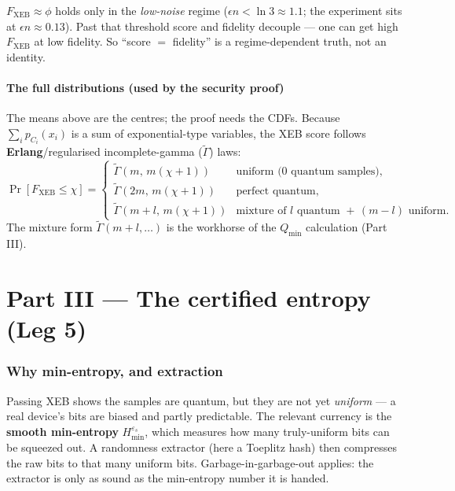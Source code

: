 \documentclass[11pt]{article}
\theoremstyle{definition}
\theoremstyle{plain}
\newcommand{\Fxeb}{F_{\mathrm{XEB}}}
\newcommand{\Hmin}{H_{\min}}
\newcommand{\epss}{\varepsilon_{s}}
\newcommand{\Qmin}{Q_{\min}}
\begin{document}
\begin{warnbox}
$\Fxeb\approx\phi$ holds only in the \emph{low-noise} regime ($\epsilon n<\ln3\approx1.1$;
the experiment sits at $\epsilon n\approx0.13$). Past that threshold score and fidelity
decouple --- one can get high $\Fxeb$ at low fidelity. So ``score $=$ fidelity'' is a
regime-dependent truth, not an identity.
\end{warnbox}

\subsection{The full distributions (used by the security proof)}
The means above are the centres; the proof needs the CDFs. Because $\sum_i p_{C_i}(x_i)$ is
a sum of exponential-type variables, the XEB score follows \textbf{Erlang}/regularised
incomplete-gamma ($\widetilde\Gamma$) laws:
\[
\Pr[\Fxeb\le\chi] =
\begin{cases}
\widetilde\Gamma(m,\,m(\chi+1)) & \text{uniform ($0$ quantum samples),}\\[2pt]
\widetilde\Gamma(2m,\,m(\chi+1)) & \text{perfect quantum,}\\[2pt]
\widetilde\Gamma(m+l,\,m(\chi+1)) & \text{mixture of $l$ quantum }+\,(m-l)\text{ uniform.}
\end{cases}
\]
The mixture form $\widetilde\Gamma(m+l,\dots)$ is the workhorse of the $\Qmin$ calculation
(Part III).

\part*{Part III --- The certified entropy (Leg 5)}

\section{Why min-entropy, and extraction}
Passing XEB shows the samples are quantum, but they are not yet \emph{uniform} --- a real
device's bits are biased and partly predictable. The relevant currency is the
\textbf{smooth min-entropy} $\Hmin^{\epss}$, which measures how many truly-uniform bits can
be squeezed out. A randomness extractor (here a Toeplitz hash) then compresses the raw bits
to that many uniform bits. Garbage-in-garbage-out applies: the extractor is only as sound
as the min-entropy number it is handed.
\end{document}
